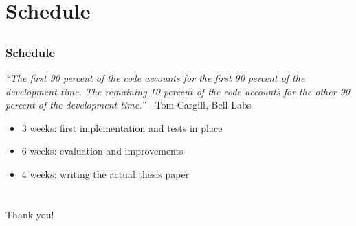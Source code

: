 \documentclass{beamer}
\begin{document}

\section{Schedule}
\subsection{}


\begin{frame}
    \frametitle{Schedule}
    \scriptsize
    \textit{``The first 90 percent of the code accounts for the first 90 percent of the development time. The remaining 10 percent of the code accounts for the other 90 percent of the development time.''} - Tom Cargill, Bell Labs
    \\
    \normalsize
    \begin{itemize}
        \item 3 weeks: first implementation and tests in place
        \item 6 weeks: evaluation and improvements
        \item 4 weeks: writing the actual thesis paper
    \end{itemize}
\end{frame}


\section{}
\begin{frame}[c]
    \begin{center}
    \Huge Thank you!
    \end{center}
\end{frame}


\end{document}
